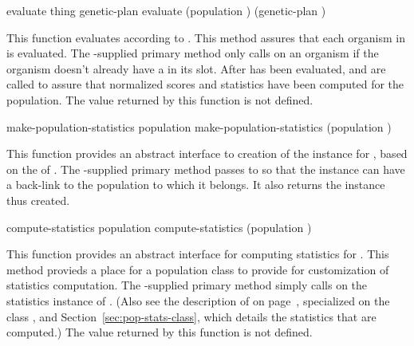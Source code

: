 {\filbreak

{\samepage
\Defgeneric evaluate {thing genetic-plan}
 evaluate {(population ) (genetic-plan )}
\label{evaluate-population}

This function evaluates  according to . This method
assures that each organism in  is evaluated. The \geco-supplied
primary method only calls  on an organism if the organism
doesn't already have a  in its  slot. After
 has been evaluated,  and
 are called to assure that normalized
scores and statistics have been computed for the population.
The value returned by this function is not defined.
\par}%

\filbreak

{\samepage
\Defgeneric make-population-statistics {population}
 make-population-statistics {(population )}
	\label{method:make-population-statistics}

This function provides an abstract interface to creation of the
 instance for , based on the
 of . The \geco-supplied
primary method passes  to  so that the instance can
have a back-link to the population to which it belongs.
It also returns the  instance thus created.
\par}%

\filbreak

{\samepage
\Defgeneric compute-statistics {population}
 compute-statistics {(population )}

This function provides an abstract interface for computing statistics for
. This method provieds a place for a population class to provide
for customization of statistics computation. The \geco-supplied primary method
simply calls  on the statistics instance of
. (Also see the description of 
on page~\pageref{compute-population-statistics},
specialized on the class , and
Section~\ref{sec:pop-stats-class}, which details the statistics that are computed.)
The value returned by this function is not defined.
\par}%

}
